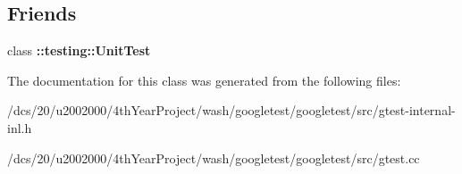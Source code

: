 \subsection*{Friends}
\begin{DoxyCompactItemize}
\item 
\mbox{\label{classtesting_1_1internal_1_1UnitTestImpl_a893404438388dec058dc5c02e8f9a014}} 
class {\bfseries \+::testing\+::\+Unit\+Test}
\end{DoxyCompactItemize}


The documentation for this class was generated from the following files\+:\begin{DoxyCompactItemize}
\item 
/dcs/20/u2002000/4th\+Year\+Project/wash/googletest/googletest/src/gtest-\/internal-\/inl.\+h\item 
/dcs/20/u2002000/4th\+Year\+Project/wash/googletest/googletest/src/gtest.\+cc\end{DoxyCompactItemize}
